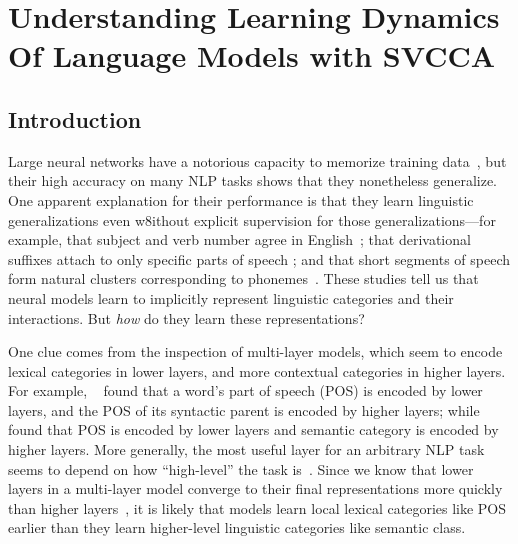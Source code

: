 \chapter{Understanding Learning Dynamics Of Language Models with SVCCA} \label{chapter:svcca}

\section{Introduction} \label{sec:intro}

Large neural networks have a notorious capacity to memorize training data~\cite{zhang_understanding_2016}, but their high accuracy on many NLP tasks shows that they nonetheless generalize. One apparent explanation for their performance is that they learn linguistic generalizations even w8ithout explicit supervision for those generalizations---for example, that subject and verb number agree in English~\cite{linzen_assessing_2016}; that derivational suffixes attach to only specific parts of speech \cite{kementchedjhieva_indicatements_2018}; and that short segments of speech form natural clusters corresponding to phonemes~\cite{alishahi_encoding_2017}. These studies tell us that neural models learn to implicitly represent linguistic categories and their interactions. But \textit{how} do they learn these representations?


One clue comes from the inspection of multi-layer models, which seem to encode lexical categories in lower layers, and more contextual categories in higher layers. For example, ~\citeauthor{blevins_deep_2018} found that a word’s part of speech (POS) is encoded by lower layers, and the POS of its syntactic parent is encoded by higher layers; while~\citeauthor{belinkov_evaluating_2018} found that POS is encoded by lower layers and semantic category is encoded by higher layers. More generally, the most useful layer for an arbitrary NLP task seems to depend on how ``high-level'' the task is~\cite{peters2018deep}. Since we know that lower layers in a multi-layer model converge to their final representations more quickly than higher layers~\cite{raghu_svcca:_2017}, it is likely that models learn local lexical categories like POS earlier than they learn higher-level linguistic categories like semantic class.

